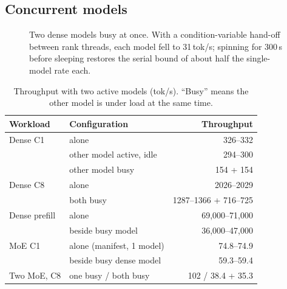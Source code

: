 \documentclass[10pt,conference,a4paper]{IEEEtran}
\begin{document}
\subsection{Concurrent models}

\begin{figure}[t]
\centering
{}
\caption{Two dense models busy at once. With a condition-variable hand-off between rank threads,
each model fell to 31\,tok/s; spinning for 300\,\textmu s before sleeping restores the serial bound
of about half the single-model rate each.}
\label{fig:concurrency}
\end{figure}

\begin{table}[t]
\caption{Throughput with two active models (tok/s). ``Busy'' means the other model is under load at the same time.}
\label{tab:concurrent}
\centering\footnotesize
\setlength{\tabcolsep}{3.5pt}
\begin{tabular}{@{}llr@{}}
\toprule
Workload & Configuration & Throughput \\
\midrule
Dense C1      & alone                           & 326--332 \\
              & other model active, idle        & 294--300 \\
              & other model busy                & 154 + 154 \\
Dense C8      & alone                           & 2026--2029 \\
              & both busy                       & 1287--1366 + 716--725 \\
Dense prefill & alone                           & 69{,}000--71{,}000 \\
              & beside busy model               & 36{,}000--47{,}000 \\
MoE C1        & alone (manifest, 1 model)       & 74.8--74.9 \\
              & beside busy dense model         & 59.3--59.4 \\
Two MoE, C8   & one busy / both busy            & 102 / 38.4 + 35.3 \\
\bottomrule
\end{tabular}
\end{table}
\end{document}
